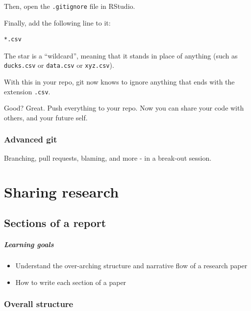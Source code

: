 \documentclass[
]{book}
\providecommand{\tightlist}{%
  \setlength{\itemsep}{0pt}\setlength{\parskip}{0pt}}
\begin{document}
Then, open the \texttt{.gitignore} file in RStudio.

Finally, add the following line to it:

\begin{verbatim}
*.csv
\end{verbatim}

The star is a ``wildcard'', meaning that it stands in place of anything (such as \texttt{ducks.csv} or \texttt{data.csv} or \texttt{xyz.csv}).

With this in your repo, git now knows to ignore anything that ends with the extension \texttt{.csv}.

Good? Great. Push everything to your repo. Now you can share your code with others, and your future self.

\hypertarget{advanced-git}{%
\section*{Advanced git}\label{advanced-git}}

Branching, pull requests, blaming, and more - in a break-out session.

\hypertarget{part-sharing-research}{%
\part{Sharing research}\label{part-sharing-research}}

\hypertarget{sections-of-a-report}{%
\chapter{Sections of a report}\label{sections-of-a-report}}

\hypertarget{learning-goals-21}{%
\subsubsection*{Learning goals}\label{learning-goals-21}}

\begin{itemize}
\tightlist
\item
  Understand the over-arching structure and narrative flow of a research paper\\
\item
  How to write each section of a paper
\end{itemize}

\hypertarget{overall-structure}{%
\section*{Overall structure}\label{overall-structure}}
\end{document}
